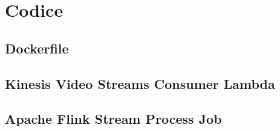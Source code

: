 \chapter{Codice}
\label{appendix:Appendice A}

\section{Dockerfile}


\newpage
\section{Kinesis Video Streams Consumer Lambda}


\newpage
\section{Apache Flink Stream Process Job}
